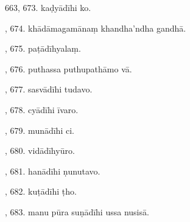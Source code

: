 663, 673. kaḍyādīhi ko.\par {}, 674. khādāmagamānaṃ khandha’ndha gandhā.\par {}, 675. paṭādīhyalaṃ.\par {}, 676. puthassa puthupathāmo vā.\par {}, 677. sasvādīhi tudavo.\par {}, 678. cyādīhi īvaro.\par {}, 679. munādīhi ci.\par {}, 680. vidādīhyūro.\par {}, 681. hanādīhi ṇunutavo.\par {}, 682. kuṭādīhi ṭho.\par {}, 683. manu pūra suṇādīhi ussa nusisā.\par \noindent
